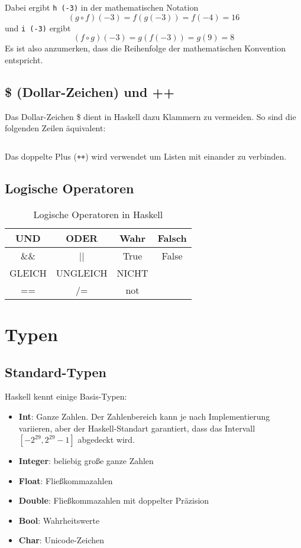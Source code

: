\inputminted[numbersep=5pt, tabsize=4]{haskell}{scripts/haskell/function-composition.hs}

Dabei ergibt \texttt{h (-3)} in der mathematischen Notation
\[(g \circ f) (-3) = f(g(-3)) = f(-4) = 16\]
und \texttt{i (-3)} ergibt
\[(f \circ g) (-3) = g(f(-3)) = g(9) = 8\]
Es ist also anzumerken, dass die Reihenfolge der mathematischen Konvention entspricht.

\subsection{\$ (Dollar-Zeichen) und ++}%
Das Dollar-Zeichen \$ dient in Haskell dazu Klammern zu vermeiden. So sind die
folgenden Zeilen äquivalent:

\inputminted[numbersep=5pt, tabsize=4]{haskell}{scripts/haskell/dollar-example.hs}

Das doppelte Plus (\texttt{++}) wird verwendet um Listen mit einander zu verbinden.

\subsection{Logische Operatoren}

\begin{table}[H]
    \centering 
    \begin{tabular}{CCCC}
    UND    & ODER     & Wahr  & Falsch \\ \hline\hline
    \&\&   & ||       & True  & False \\[4ex]
    GLEICH & UNGLEICH & NICHT & ~     \\ \hline\hline
    ==     & /=       & not   & ~     \\ 
    \end{tabular}
    \caption{Logische Operatoren in Haskell}
\end{table}

\section{Typen}
\subsection{Standard-Typen}
Haskell kennt einige Basis-Typen:
\begin{itemize}
  \item \textbf{Int}: Ganze Zahlen. Der Zahlenbereich kann je nach Implementierung variieren,
  aber der Haskell-Standart garantiert, dass das Intervall 
  $[-2^{29}, 2^{29}-1]$ abgedeckt wird.
  \item \textbf{Integer}: beliebig große ganze Zahlen
  \item \textbf{Float}: Fließkommazahlen
  \item \textbf{Double}: Fließkommazahlen mit doppelter Präzision
  \item \textbf{Bool}: Wahrheitswerte
  \item \textbf{Char}: Unicode-Zeichen
\end{itemize}

